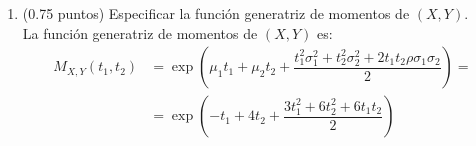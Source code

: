 \documentclass[12pt]{article}
\begin{document}
\begin{ejercicio}[2 puntos]
\begin{enumerate}
            \item (0.75 puntos) Especificar la función generatriz de momentos de $(X, Y)$.\\
            
            La función generatriz de momentos de $(X,Y)$ es:
            \begin{align*}
                M_{X,Y}(t_1,t_2) &= \exp\left(\mu_1t_1+\mu_2t_2+\dfrac{t_1^2\sigma_1^2+t_2^2\sigma_2^2+2t_1t_2\rho\sigma_1\sigma_2}{2}\right)
                =\\&= 
                \exp\left(-t_1+4t_2+\dfrac{3t_1^2+6t_2^2+6t_1t_2}{2}\right)
            \end{align*}
        \end{enumerate}
    \end{ejercicio}
\end{document}
